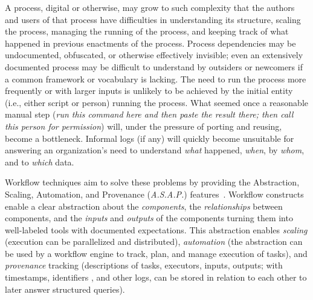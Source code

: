 \documentclass[sigconf,authordraft]{acmart}
\begin{document}
 A process, digital or otherwise, may grow to such complexity that the authors and users of that process have difficulties in understanding its structure, scaling the process, managing the running of the process, and keeping track of what happened in previous enactments of the process. Process dependencies may be undocumented, obfuscated, or otherwise effectively invisible; even an extensively documented process may be difficult to understand by outsiders or newcomers if a common framework or vocabulary is lacking. The need to run the process more frequently or with larger inputs is unlikely to be achieved  by the initial entity (i.e., either script or person) running the process. What seemed once a reasonable manual step (\textit{run this command here and then paste the result there; then call this person for permission}) will, under the pressure of porting and reusing, become a bottleneck. Informal logs (if any) will quickly become unsuitable for answering an organization's need to understand \textit{what} happened, \textit{when}, by \textit{whom}, and to \textit{which} data.


Workflow techniques aim to solve these problems by providing the Abstraction, Scaling, Automation, and Provenance (\textit{A.S.A.P.}) features~\cite{cuevas-vicenttin_scientific_2012}.  Workflow constructs enable a clear abstraction about the \textit{components}, the \textit{relationships} between components, and the \textit{inputs} and \textit{outputs} of the components turning them into well-labeled tools with documented expectations. This abstraction enables \textit{scaling} (execution can be parallelized and distributed), \textit{automation} (the abstraction can be used by a workflow engine to track, plan, and manage execution of tasks), and \textit{provenance} tracking (descriptions of tasks, executors, inputs, outputs; with timestamps, identifiers , and other logs, can be stored in relation to each other to later answer structured queries).
\end{document}
